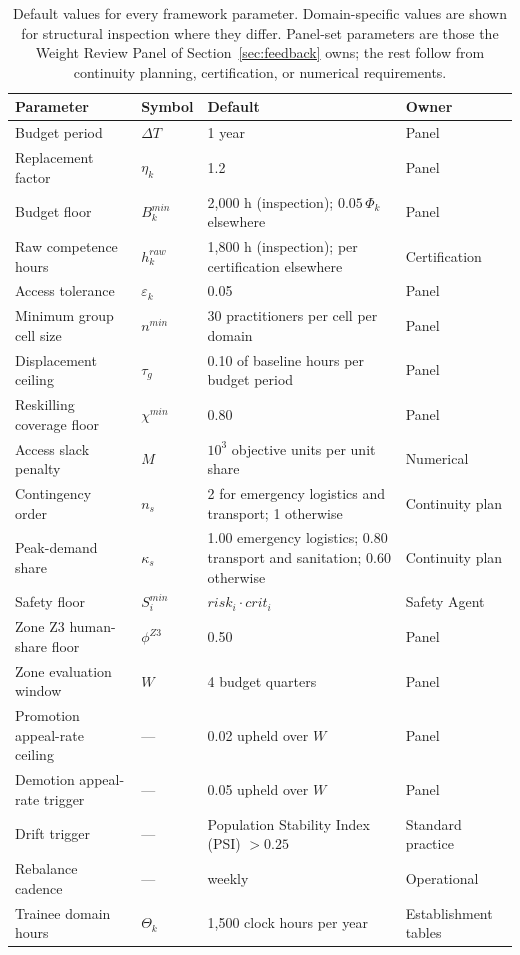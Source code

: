 	\begin{table}[!htbp]
		\caption{Default values for every framework parameter. Domain-specific values are shown for structural inspection where they differ. Panel-set parameters are those the Weight Review Panel of Section~\ref{sec:feedback} owns; the rest follow from continuity planning, certification, or numerical requirements.}
		\label{tab:params}
		\small
		\begin{tabularx}{\textwidth}{@{}llXl@{}}
			\toprule
			\textbf{Parameter} & \textbf{Symbol} & \textbf{Default} & \textbf{Owner}\\
			\midrule
			Budget period & $\Delta T$ & 1 year & Panel\\
			Replacement factor & $\eta_k$ & 1.2 & Panel\\
			Budget floor & $B^{min}_k$ & 2{,}000 h (inspection); $0.05\,\Phi_k$ elsewhere & Panel\\
			Raw competence hours & $h^{raw}_k$ & 1{,}800 h (inspection); per certification elsewhere & Certification\\
			Access tolerance & $\varepsilon_k$ & 0.05 & Panel\\
			Minimum group cell size & $n^{min}$ & 30 practitioners per cell per domain & Panel\\
			Displacement ceiling & $\tau_g$ & 0.10 of baseline hours per budget period & Panel\\
			Reskilling coverage floor & $\chi^{min}$ & 0.80 & Panel\\
			Access slack penalty & $M$ & $10^{3}$ objective units per unit share & Numerical\\
			Contingency order & $n_s$ & 2 for emergency logistics and transport; 1 otherwise & Continuity plan\\
			Peak-demand share & $\kappa_s$ & 1.00 emergency logistics; 0.80 transport and sanitation; 0.60 otherwise & Continuity plan\\
			Safety floor & $S^{min}_i$ & $risk_i\cdot crit_i$ & Safety Agent\\
			Zone Z3 human-share floor & $\phi^{Z3}$ & 0.50 & Panel\\
			Zone evaluation window & $W$ & 4 budget quarters & Panel\\
			Promotion appeal-rate ceiling & --- & 0.02 upheld over $W$ & Panel\\
			Demotion appeal-rate trigger & --- & 0.05 upheld over $W$ & Panel\\
			Drift trigger & --- & Population Stability Index (PSI) $>0.25$ & Standard practice\\
			Rebalance cadence & --- & weekly & Operational\\
			Trainee domain hours & $\Theta_k$ & 1{,}500 clock hours per year & Establishment tables\\
			\bottomrule
		\end{tabularx}
	\end{table}
	
